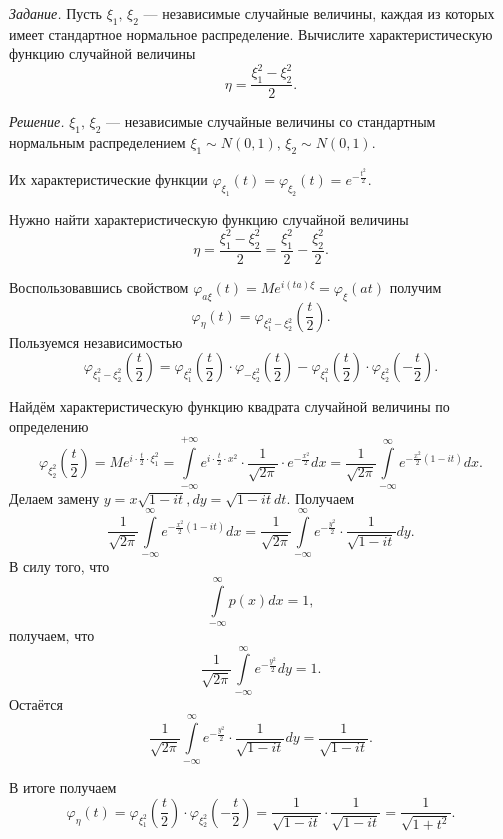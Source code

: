 \textit{Задание.}
Пусть $ \xi_1, \, \xi_2$ --- независимые случайные величины,
каждая из которых имеет стандартное нормальное распределение.
Вычислите характеристическую функцию случайной величины
$$ \eta =
\frac{ \xi_1^2 - \xi_2^2}{2}.$$

\textit{Решение.}
$ \xi_1, \, \xi_2$ ---
независимые случайные величины со стандартным нормальным распределением
$ \xi_1 \sim N \left( 0, 1 \right), \,
  \xi_2 \sim N \left( 0, 1 \right) $.

Их характеристические функции
$ \varphi_{ \xi_1} \left( t \right) =
  \varphi_{ \xi_2} \left( t \right) =
  e^{- \frac{t^2}{2}}$.

Нужно найти характеристическую функцию случайной величины
$$ \eta =
  \frac{ \xi_1^2 - \xi_2^2}{2} =
  \frac{ \xi_1^2}{2} - \frac{ \xi_2^2}{2}.$$

Воспользовавшись свойством
$ \varphi_{a \xi } \left( t \right) =
  Me^{i \left( ta \right) \xi } =
  \varphi_{ \xi } \left( at \right) $
получим
$$ \varphi_{ \eta } \left( t \right) =
  \varphi_{ \xi_1^2 - \xi_2^2} \left( \frac{t}{2} \right).$$
Пользуемся независимостью
$$ \varphi_{ \xi_1^2 - \xi_2^2} \left( \frac{t}{2} \right) =
  \varphi_{ \xi_1^2} \left( \frac{t}{2} \right) \cdot
  \varphi_{- \xi_2^2} \left( \frac{t}{2} \right) -
  \varphi_{ \xi_1^2} \left( \frac{t}{2} \right) \cdot
  \varphi_{ \xi_2^2} \left( - \frac{t}{2} \right).$$

Найдём характеристическую функцию квадрата случайной величины по определению
$$ \varphi_{ \xi_2^2} \left( \frac{t}{2} \right) =
  Me^{i \cdot \frac{t}{2} \cdot \xi_1^2} =
  \int \limits_{- \infty }^{+ \infty } e^{i \cdot \frac{t}{2} \cdot x^2} \cdot
  \frac{1}{ \sqrt{2 \pi }} \cdot e^{- \frac{x^2}{2}}dx =
  \frac{1}{ \sqrt{2 \pi }} \int \limits_{- \infty }^{ \infty }
  e^{- \frac{x^2}{2} \left( 1 - it \right) }dx.$$
Делаем замену $y = x \sqrt{1 - it}, dy = \sqrt{1 - it}dt$.
Получаем
$$ \frac{1}{ \sqrt{2 \pi }}
  \int \limits_{- \infty }^{ \infty } e^{- \frac{x^2}{2} \left( 1 - it \right) }dx =
  \frac{1}{ \sqrt{2 \pi }}
  \int \limits_{- \infty }^{ \infty } e^{- \frac{y^2}{2}} \cdot \frac{1}{ \sqrt{1 - it}} dy.$$
В силу того, что
$$ \int \limits_{- \infty }^{ \infty }p \left( x \right) dx =
  1,$$
получаем, что
$$ \frac{1}{ \sqrt{2 \pi }} \int \limits_{- \infty }^{ \infty } e^{- \frac{y^2}{2}}dy =
  1.$$
Остаётся
$$ \frac{1}{ \sqrt{2 \pi }}
  \int \limits_{- \infty }^{ \infty } e^{- \frac{y^2}{2}} \cdot \frac{1}{ \sqrt{1 - it}} dy =
  \frac{1}{ \sqrt{1 - it}}.$$

В итоге получаем
$$ \varphi_{ \eta } \left( t \right) =
  \varphi_{ \xi_1^2} \left( \frac{t}{2} \right) \cdot
  \varphi_{ \xi_2^2} \left( - \frac{t}{2} \right) =
  \frac{1}{ \sqrt{1 - it}} \cdot \frac{1}{ \sqrt{1 - it}} =
  \frac{1}{ \sqrt{1 + t^2}}.$$

